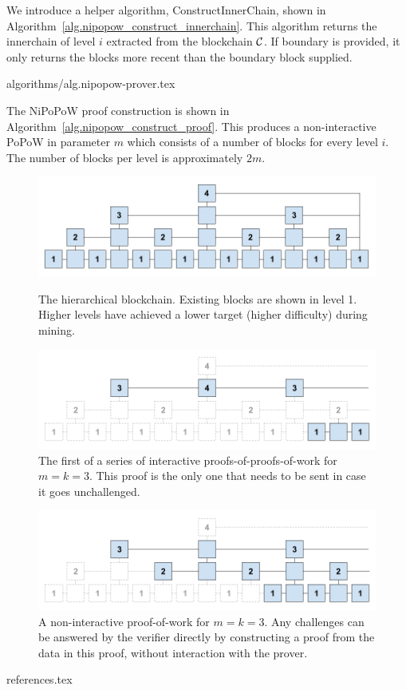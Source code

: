 \documentclass[11pt]{llncs}
\begin{document}
We introduce a helper algorithm, ConstructInnerChain, shown in
Algorithm~\ref{alg.nipopow_construct_innerchain}. This algorithm returns the innerchain
of level $i$ extracted from the blockchain $\mathcal{C}$. If boundary is provided,
it only returns the blocks more recent than the boundary block supplied.

{algorithms/alg.nipopow-prover.tex}

The NiPoPoW proof construction is shown in Algorithm~\ref{alg.nipopow_construct_proof}.
This produces a non-interactive PoPoW in parameter $m$ which consists of a
number of blocks for every level $i$. The number of blocks per level is
approximately $2m$.

\begin{figure}[h]
    \caption{The hierarchical blockchain. Existing blocks are shown in level 1.
    Higher levels have achieved a lower target (higher difficulty) during mining.}
    \centering
    \includegraphics[width=\textwidth,keepaspectratio]{figures/hierarchical-ledger.png}
    \label{fig:hierarchy}
\end{figure}

\begin{figure}[h]
    \caption{The first of a series of interactive proofs-of-proofs-of-work for
    $m = k = 3$. This proof is the only one that needs to be sent in case it
    goes unchallenged.}
    \centering
    \includegraphics[width=\textwidth,keepaspectratio]{figures/interactive-popow.png}
\end{figure}

\begin{figure}[h]
    \caption{A non-interactive proof-of-work for $m = k = 3$. Any challenges
    can be answered by the verifier directly by constructing a proof from the
    data in this proof, without interaction with the prover.}
    \centering
    \includegraphics[width=\textwidth,keepaspectratio]{figures/non-interactive-popow.png}
\end{figure}

{references.tex}
\end{document}
